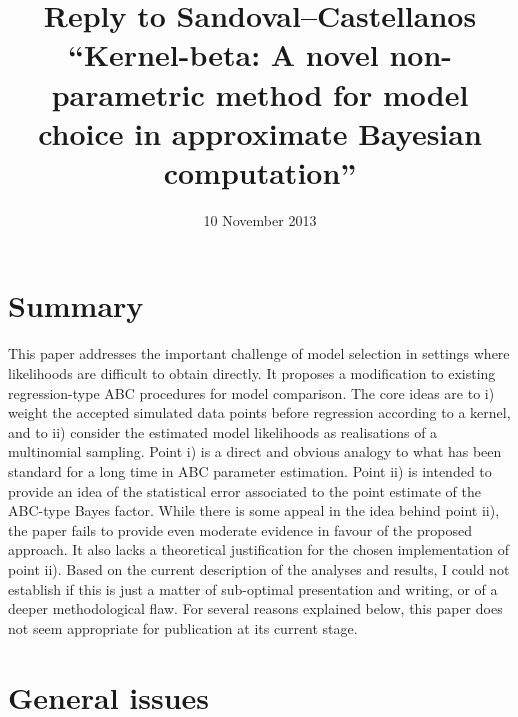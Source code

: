 \documentclass[11pt]{article}
\title{Reply to Sandoval--Castellanos ``Kernel-beta: A novel non-parametric method for model choice in approximate Bayesian computation''}
\date{10 November 2013}                                           %
\begin{document}
\maketitle

\section{Summary}
This paper addresses the important challenge of model selection in settings where likelihoods are difficult to obtain directly. It proposes a modification to existing regression-type ABC procedures for model comparison. The core ideas are to i) weight the accepted simulated data points before regression according to a kernel, and to ii) consider the estimated model likelihoods as realisations of a multinomial sampling. Point i) is a direct and obvious analogy to what has been standard for a long time in ABC parameter estimation. Point ii) is intended to provide an idea of the statistical error associated to the point estimate of the ABC-type Bayes factor. While there is some appeal in the idea behind point ii), the paper fails to provide even moderate evidence in favour of the proposed approach. It also lacks a theoretical justification for the chosen implementation of point ii). Based on the current description of the analyses and results, I could not establish if this is just a matter of sub-optimal presentation and writing, or of a deeper methodological flaw. For several reasons explained below, this paper does not seem appropriate for publication at its current stage.

\section{General issues}
\end{document}
